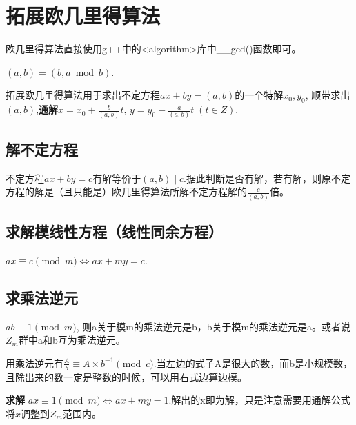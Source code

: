 \section{拓展欧几里得算法}
	\par 欧几里得算法直接使用g++中的<algorithm>库中\_\_gcd()函数即可。
	\par $(a,b)=(b,a \bmod b)$.
	\par 拓展欧几里得算法用于求出不定方程$ax+by=(a,b)$的一个特解$x_0,y_0$, 顺带求出$(a,b)$,{\bfseries 通解$x=x_0+\frac{b}{(a,b)}t,\,y=y_0-\frac{a}{(a,b)}t \; (t \in Z)$}.
	\subsection{解不定方程}
		\par 不定方程$ax+by=c$有解等价于$(a,b) \mid c$.据此判断是否有解，若有解，则原不定方程的解是（且只能是）欧几里得算法所解不定方程解的$\frac{c}{(a,b)}$倍。
	\subsection{求解模线性方程（线性同余方程）}
		$ax \equiv c\pmod{m} \Longleftrightarrow ax+my=c$.
	\subsection{求乘法逆元}
		\par $ab \equiv 1 \pmod{m}$, 则a关于模m的乘法逆元是b，b关于模m的乘法逆元是a。或者说$Z_m$群中a和b互为乘法逆元。
		\par 用乘法逆元有$\frac{A}{b} \equiv A \times b^{-1} \pmod{c}$.当左边的式子A是很大的数，而b是小规模数，且除出来的数一定是整数的时候，可以用右式边算边模。
		\par \textbf{求解} $ax \equiv 1 \pmod{m} \Longleftrightarrow ax+my= 1$.解出的x即为解，只是注意需要用通解公式将$x$调整到$Z_m$范围内。
